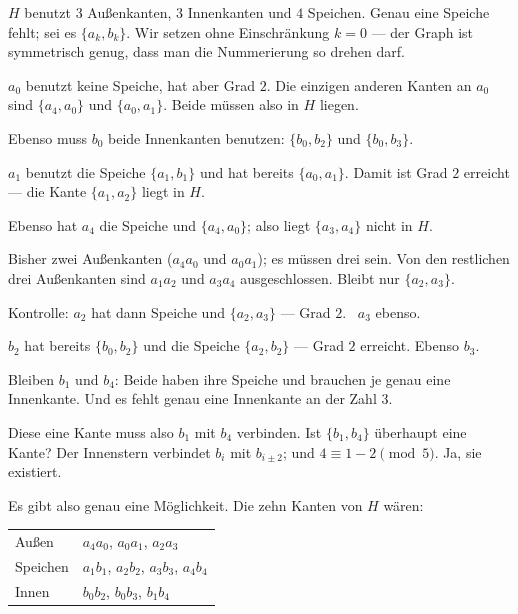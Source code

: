 \begin{merksatz}
$H$ benutzt $3$ Außenkanten, $3$ Innenkanten und $4$ Speichen. Genau eine Speiche fehlt; sei es $\{a_k, b_k\}$. Wir setzen ohne Einschränkung $k = 0$ --- der Graph ist symmetrisch genug, dass man die Nummerierung so drehen darf.

$a_0$ benutzt keine Speiche, hat aber Grad $2$. Die einzigen anderen Kanten an $a_0$ sind $\{a_4, a_0\}$ und $\{a_0, a_1\}$. Beide müssen also in $H$ liegen.

Ebenso muss $b_0$ beide Innenkanten benutzen: $\{b_0, b_2\}$ und $\{b_0, b_3\}$.

$a_1$ benutzt die Speiche $\{a_1,b_1\}$ und hat bereits $\{a_0,a_1\}$. Damit ist Grad $2$ erreicht --- die Kante $\{a_1, a_2\}$ liegt  in $H$.

Ebenso hat $a_4$ die Speiche und $\{a_4,a_0\}$; also liegt $\{a_3,a_4\}$ nicht in $H$.

Bisher zwei Außenkanten ($a_4a_0$ und $a_0a_1$); es müssen drei sein. Von den restlichen drei Außenkanten sind $a_1a_2$ und $a_3a_4$ ausgeschlossen. Bleibt nur $\{a_2, a_3\}$.

Kontrolle: $a_2$ hat dann Speiche und $\{a_2,a_3\}$ --- Grad $2$. \checkmark\ $a_3$ ebenso. \checkmark

$b_2$ hat bereits $\{b_0,b_2\}$ und die Speiche $\{a_2,b_2\}$ --- Grad $2$ erreicht. Ebenso $b_3$.

Bleiben $b_1$ und $b_4$: Beide haben ihre Speiche und brauchen je genau eine Innenkante. Und es fehlt genau eine Innenkante an der Zahl $3$.

Diese eine Kante muss also $b_1$ mit $b_4$ verbinden. Ist $\{b_1, b_4\}$ überhaupt eine Kante? Der Innenstern verbindet $b_i$ mit $b_{i\pm2}$; und $4 \equiv 1 - 2 \pmod 5$. Ja, sie existiert.

Es gibt also genau eine Möglichkeit. Die zehn Kanten von $H$ wären:
\begin{center}
\renewcommand{\arraystretch}{1.42}
\begin{tabular}{@{}P{2.4cm}P{5.8cm}@{}}
\toprule
Außen & $a_4a_0$, $a_0a_1$, $a_2a_3$\\
Speichen & $a_1b_1$, $a_2b_2$, $a_3b_3$, $a_4b_4$\\
Innen & $b_0b_2$, $b_0b_3$, $b_1b_4$\\
\bottomrule
\end{tabular}
\end{center}


\end{merksatz}
